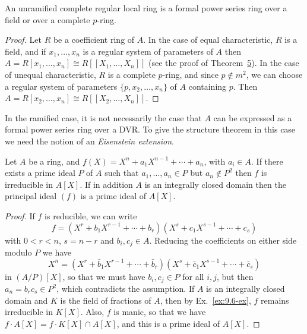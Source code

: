\begin{theorem}\label{thm:29.8}
An unramified complete regular local ring is a formal power series ring over a
field or over a complete $p$-ring.
\end{theorem}

\begin{proof}
Let $R$ be a coefficient ring of $A$. In the case of equal characteristic, $R$ is a
field, and if $x_1, \ldots, x_n$ is a regular system of parameters of $A$ then
$A = R[x_1, \ldots, x_n] \cong R[[X_1, \ldots, X_n]]$ (see the proof of
Theorem~\hyperref[thm:29.5]{5}). In the case of unequal characteristic, $R$ is a complete $p$-ring,
and since $p \notin m^2$, we can choose a regular system of parameters
$\{p, x_2, \ldots, x_n\}$ of $A$ containing $p$. Then $A = R[x_2, \ldots, x_n] \cong
R[[X_2, \ldots, X_n]]$.
\end{proof}

In the ramified case, it is not necessarily the case that $A$ can be expressed as
a formal power series ring over a DVR. To give the structure theorem in this
case we need the notion of an \emph{Eisenstein extension}.

\begin{lemma}\label{lem:29.1}
Let $A$ be a ring, and $f(X) = X^n + a_1X^{n-1} + \cdots + a_n$, with $a_i \in A$. If there
exists a prime ideal $P$ of $A$ such that $a_1, \ldots, a_n \in P$ but $a_n \notin P^2$ then $f$
is irreducible in $A[X]$. If in addition $A$ is an integrally closed domain then
the principal ideal $(f)$ is a prime ideal of $A[X]$.
\end{lemma}

\begin{proof}
If $f$ is reducible, we can write
\[
  f = (X^r + b_1X^{r-1} + \cdots + b_r)(X^s + c_1X^{s-1} + \cdots + c_s)
\]
with $0 < r < n$, $s = n - r$ and $b_i, c_j \in A$. Reducing the coefficients on either
side modulo $P$ we have
\[
  X^n = (X^r + \bar{b}_1X^{r-1} + \cdots + \bar{b}_r)(X^s + \bar{c}_1X^{s-1} + \cdots + \bar{c}_s)
\]
in $(A/P)[X]$, so that we must have $b_i, c_j \in P$ for all $i, j$, but then
$a_n = b_rc_s \in P^2$, which contradicts the assumption. If $A$ is an integrally closed
domain and $K$ is the field of fractions of $A$, then by Ex.~\ref{ex:9.6-ex}, $f$ remains
irreducible in $K[X]$. Also, $f$ is manic, so that we have
$f \cdot A[X] = f \cdot K[X] \cap A[X]$, and this is a prime ideal of $A[X]$.
\end{proof}

